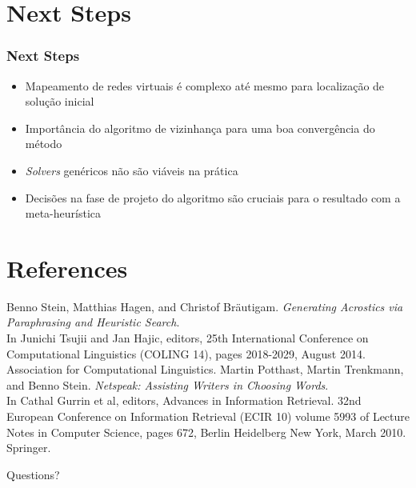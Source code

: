 \documentclass{beamer}
\begin{document}
\section{Next Steps}

\begin{frame}
\frametitle{Next Steps}
\begin{itemize}
\item Mapeamento de redes virtuais é complexo até mesmo para localização de solução inicial
\item Importância do algoritmo de vizinhança para uma boa convergência do método
\item \emph{Solvers} genéricos não são viáveis na prática
\item Decisões na fase de projeto do algoritmo são cruciais para o resultado com a meta-heurística
\end{itemize}
\end{frame}

\section{References}

\begin{thebibliography}{1}
	Benno Stein, Matthias Hagen, and Christof Bräutigam. \emph{Generating Acrostics via Paraphrasing and Heuristic Search}. \\
	In Junichi Tsujii and Jan Hajic, editors, 25th International Conference on Computational Linguistics (COLING 14), pages 2018-2029, August 2014. Association for Computational Linguistics. 
	Martin Potthast, Martin Trenkmann, and Benno Stein.
	\emph{Netspeak: Assisting Writers in Choosing Words}. \\
	In Cathal Gurrin et al, editors, Advances in Information Retrieval. 32nd European Conference on Information Retrieval (ECIR 10) volume 5993 of Lecture Notes in Computer Science, pages 672, Berlin Heidelberg New York, March 2010. Springer.
\end{thebibliography}

\begin{frame}
\Huge{\centerline{Questions?}}
\end{frame}

\end{document}
